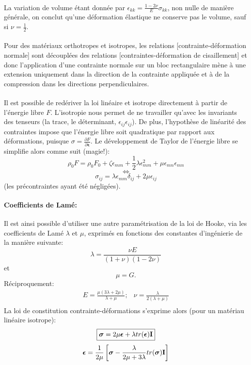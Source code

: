 \paragraph{}
La variation de volume étant donnée par $\epsilon_{kk}=\frac{1-2\nu}{E}\sigma_{kk}$, non nulle de manière générale, on conclut qu'une déformation élastique ne conserve pas le volume, sauf si $\nu=\frac{1}{2}$.
\paragraph{}
Pour des matériaux orthotropes et isotropes, les relations [contrainte-déformation normale] sont découplées des relations [contraintes-déformation de cisaillement] et donc l'application d'une contrainte normale sur un bloc rectangulaire mène à une extension uniquement dans la direction de la contrainte appliquée et à de la compression dans les directions perpendiculaires.
\paragraph{}
Il est possible de redériver la loi linéaire et isotrope directement à partir de l'énergie libre $F$. L'isotropie nous permet de ne travailler qu'avec les invariants des tenseurs (la trace, le déterminant, $\epsilon_{ij}\epsilon_{ij}$). De plus, l'hypothèse de linéarité des contraintes impose que l'énergie libre soit quadratique par rapport aux déformations, puisque $\sigma=\frac{\partial F}{\partial \boldsymbol{\epsilon}}$. Le développement de Taylor de l'énergie libre se simplifie alors comme suit (magie!):
$$\rho_0F=\rho_0F_0+\zeta\epsilon_{mm}+\frac{1}{2}\lambda\epsilon_{mm}^2+\mu\epsilon_{mn}\epsilon_{mn}$$
$$\Leftrightarrow$$
$$\sigma_{ij}=\lambda\epsilon_{mm}\delta_{ij}+2\mu\epsilon_{ij}$$ (les précontraintes ayant été négligées).
\paragraph{Coefficients de Lamé: }
Il est ainsi possible d'utiliser une autre paramétrisation de la loi de Hooke, via les coefficients de Lamé $\lambda$ et $\mu$, exprimés en fonctions des constantes d'ingénierie de la manière suivante:
$$\lambda=\frac{\nu E}{(1+\nu)(1-2\nu)}$$ et $$\mu=G.$$
Réciproquement:
$$\begin{array}{cc}
E=\frac{\mu(3\lambda+2\mu)}{\lambda + \mu};&\nu=\frac{\lambda}{2(\lambda+\mu)}\\
\end{array}$$
La loi de constitution contrainte-déformations s'exprime alors (pour un matériau linéaire isotrope):
$$\boxed{\boldsymbol{\sigma}=2\mu\boldsymbol{\epsilon}+\lambda tr(\boldsymbol{\epsilon})\textbf{I}}$$
$$\boldsymbol{\epsilon}=\frac{1}{2\mu}\left[\boldsymbol{\sigma}-\frac{\lambda}{2\mu+3\lambda}tr(\boldsymbol{\sigma})\textbf{I}\right]$$

